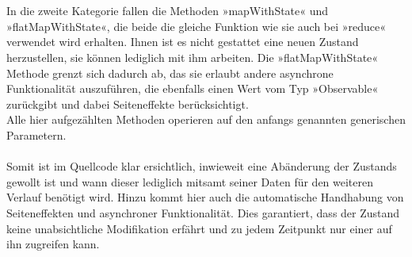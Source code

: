 \\\\
In die zweite Kategorie fallen die Methoden »mapWithState« und »flatMapWithState«, die beide die gleiche Funktion wie sie auch bei »reduce« verwendet wird erhalten. Ihnen ist es nicht gestattet eine neuen Zustand herzustellen, sie können lediglich mit ihm arbeiten. Die »flatMapWithState« Methode grenzt sich dadurch ab, das sie erlaubt andere asynchrone Funktionalität auszuführen, die ebenfalls einen Wert vom Typ »Observable« zurückgibt und dabei Seiteneffekte berücksichtigt.
\\
Alle hier aufgezählten Methoden operieren auf den anfangs genannten generischen Parametern. 
\\\\
Somit ist im Quellcode klar ersichtlich, inwieweit eine Abänderung der Zustands gewollt ist und wann dieser lediglich mitsamt seiner Daten für den weiteren Verlauf benötigt wird. Hinzu kommt hier auch die automatische Handhabung von Seiteneffekten und asynchroner Funktionalität. Dies garantiert, dass der Zustand keine unabsichtliche Modifikation erfährt und zu jedem Zeitpunkt nur einer auf ihn zugreifen kann.

